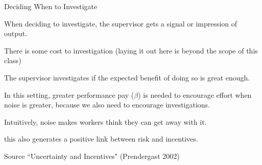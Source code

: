 \documentclass[aspectratio=169,usenames,dvipsnames]{beamer}
\newenvironment{wideitemize}{\itemize\addtolength{\itemsep}{10pt}}{\enditemize}
\begin{document}
\begin{frame}{Deciding When to Investigate}

\begin{wideitemize}
     \item When deciding to investigate, the supervisor gets a signal or impression of output.
     \item There is some cost to investigation (laying it out here is beyond the scope of this class)
     \item The supervisor investigates if the expected benefit of doing so is great enough.
     \item In this setting, greater performance pay ($\beta$) is needed to encourage effort when noise is greater, because we also need to encourage investigations.
     \item Intuitively, noise makes workers think they can get away with it.
     \item this also generates a positive link between risk and incentives.
\end{wideitemize}



\small Source ``Uncertainty and Incentives" (Prendergast 2002)

    
\end{frame}








\end{document}
